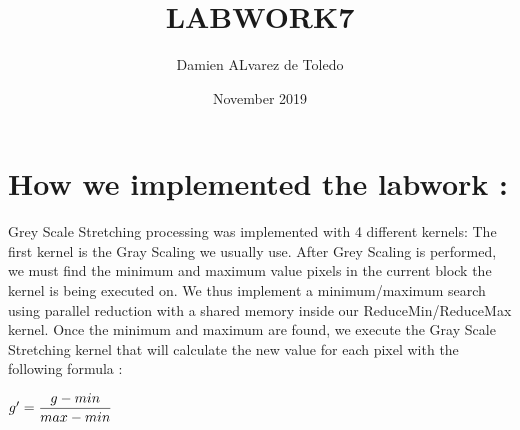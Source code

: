 \documentclass{article}
\title{LABWORK7}
\author{Damien ALvarez de Toledo}
\date{November 2019}
\begin{document}
\maketitle

\section{How we implemented the labwork :}\newline

Grey Scale Stretching processing was implemented with 4 different kernels: \newline
The first kernel is the Gray Scaling we usually use.\newline
After Grey Scaling is performed, we must find the minimum and maximum value pixels in the current block the kernel is being executed on. We thus implement a minimum/maximum search using parallel reduction with a shared memory inside our ReduceMin/ReduceMax kernel.\newline
Once the minimum and maximum are found, we execute the Gray Scale Stretching kernel that will calculate the new value for each pixel with the following formula :\newline

$g'=\dfrac{g - min}{max - min}\newline$
\end{document}
